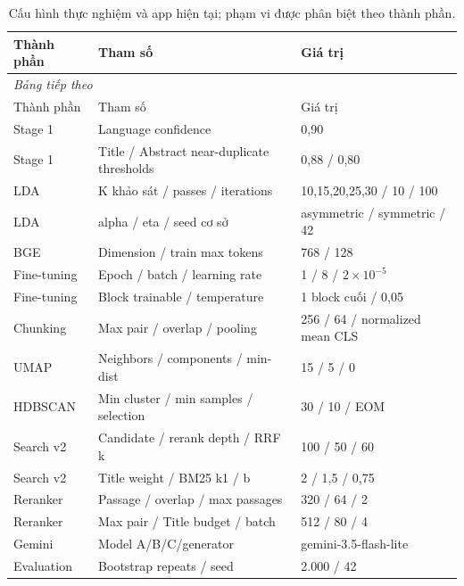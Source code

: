 \begingroup\small\setlength{\tabcolsep}{4pt}\renewcommand{\arraystretch}{1.16}
\begin{longtable}{p{.19\linewidth}p{.40\linewidth}p{.31\linewidth}}
\caption{Cấu hình thực nghiệm và app hiện tại; phạm vi được phân biệt theo thành phần.}\label{tab:configuration}\\
\toprule Thành phần & Tham số & Giá trị \\
\midrule\endfirsthead
\multicolumn{3}{l}{\textit{Bảng tiếp theo}}\\
\toprule Thành phần & Tham số & Giá trị \\
\midrule\endhead
\bottomrule\endfoot
Stage 1 & Language confidence & 0,90 \\
Stage 1 & Title / Abstract near-duplicate thresholds & 0,88 / 0,80 \\
LDA & K khảo sát / passes / iterations & 10,15,20,25,30 / 10 / 100 \\
LDA & alpha / eta / seed cơ sở & asymmetric / symmetric / 42 \\
BGE & Dimension / train max tokens & 768 / 128 \\
Fine-tuning & Epoch / batch / learning rate & 1 / 8 / $2\times10^{-5}$ \\
Fine-tuning & Block trainable / temperature & 1 block cuối / 0,05 \\
Chunking & Max pair / overlap / pooling & 256 / 64 / normalized mean CLS \\
UMAP & Neighbors / components / min-dist & 15 / 5 / 0 \\
HDBSCAN & Min cluster / min samples / selection & 30 / 10 / EOM \\
Search v2 & Candidate / rerank depth / RRF k & 100 / 50 / 60 \\
Search v2 & Title weight / BM25 k1 / b & 2 / 1,5 / 0,75 \\
Reranker & Passage / overlap / max passages & 320 / 64 / 2 \\
Reranker & Max pair / Title budget / batch & 512 / 80 / 4 \\
Gemini & Model A/B/C/generator & gemini-3.5-flash-lite \\
Evaluation & Bootstrap repeats / seed & 2.000 / 42 \\
\end{longtable}\endgroup
{}

